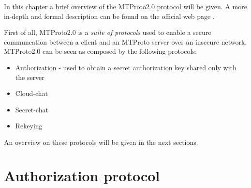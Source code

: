 
In this chapter a brief overview of the MTProto2.0 protocol will be given. A more in-depth and formal description can be found on the official web page \cite{Telegram-MTProto2.0}.

First of all, MTProto2.0 is a \textit{suite of protocols} used to enable a secure communcation between a client and an MTProto server over an insecure network. MTProto2.0 can be seen as composed by the following protocols:

\begin{itemize}
    \item{Authorization - used to obtain a secret authorization key shared only with the server}
    \item{Cloud-chat}
    \item{Secret-chat}
    \item{Rekeying}
\end{itemize}

An overview on these protocols will be given in the next sections.

\section{Authorization protocol}

